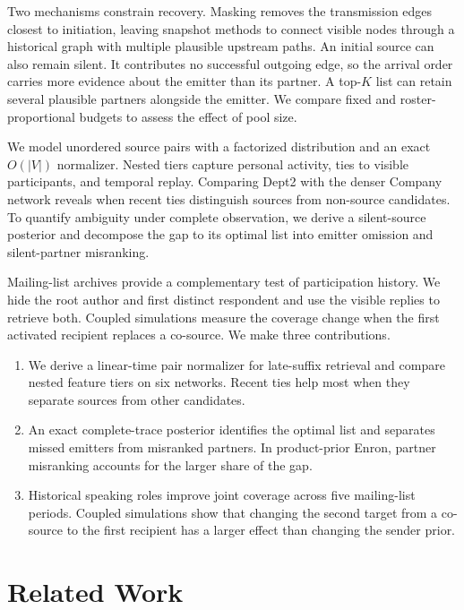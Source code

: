 \documentclass[a4paper,runningheads]{llncs}
\DeclareRobustCommand{\pdfcopytext}[2]{%
  \BeginAccSupp{method=pdfstringdef,unicode,ActualText={#1}}%
  #2%
  \EndAccSupp{}%
}
\begin{document}
Two mechanisms constrain recovery. Masking removes the transmission edges closest to initiation, leaving snapshot methods to connect visible nodes through a historical graph with multiple plausible upstream paths. An initial source can also remain silent. It contributes no successful outgoing edge, so the arrival order carries more evidence about the emitter than its partner. A \pdfcopytext{top-K}{\mbox{top-$K$}} list can retain several plausible partners alongside the emitter. We compare fixed and roster-proportional budgets to assess the effect of pool size.

We model unordered source pairs with a factorized distribution and an exact $O(\vert{}V\vert{})$ normalizer. Nested tiers capture personal activity, ties to visible participants, and temporal replay. Comparing Dept2 with the denser Company network reveals when recent ties distinguish sources from non-source candidates. To quantify ambiguity under complete observation, we derive a silent-source posterior and decompose the gap to its optimal list into emitter omission and silent-partner misranking.

Mailing-list archives provide a complementary test of participation history. We hide the root author and first distinct respondent and use the visible replies to retrieve both. Coupled simulations measure the coverage change when the first activated recipient replaces a co-source. We make three contributions.

\begin{enumerate}
\item We derive a linear-time pair normalizer for late-suffix retrieval and compare nested feature tiers on six networks. Recent ties help most when they separate sources from other candidates.
\item An exact complete-trace posterior identifies the optimal list and separates missed emitters from misranked partners. In product-prior Enron, partner misranking accounts for the larger share of the gap.
\item Historical speaking roles improve joint coverage across five mailing-list periods. Coupled simulations show that changing the second target from a co-source to the first recipient has a larger effect than changing the sender prior.
\end{enumerate}

\section{Related Work}
\end{document}
